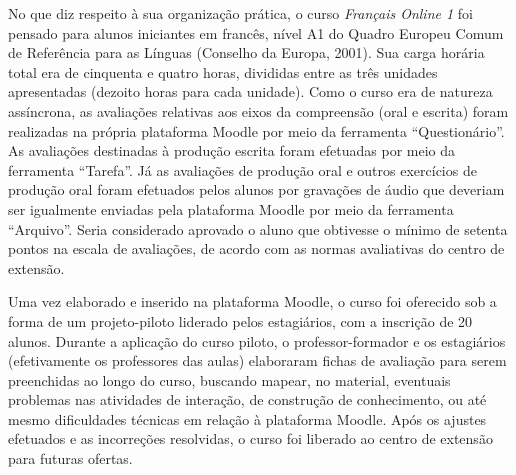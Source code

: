 No que diz respeito à sua organização prática, o curso \emph{Français
	Online 1} foi pensado para alunos iniciantes em francês, nível A1 do
Quadro Europeu Comum de Referência para as Línguas (Conselho da Europa,
2001). Sua carga horária total era de cinquenta e quatro horas,
divididas entre as três unidades apresentadas (dezoito horas para cada
unidade). Como o curso era de natureza assíncrona, as avaliações
relativas aos eixos da compreensão (oral e escrita) foram realizadas na
própria plataforma Moodle por meio da ferramenta \enquote{Questionário}. As
avaliações destinadas à produção escrita foram efetuadas por meio da
ferramenta \enquote{Tarefa}. Já as avaliações de produção oral e outros
exercícios de produção oral foram efetuados pelos alunos por gravações
de áudio que deveriam ser igualmente enviadas pela plataforma Moodle por
meio da ferramenta \enquote{Arquivo}. Seria considerado aprovado o aluno que
obtivesse o mínimo de setenta pontos na escala de avaliações, de acordo
com as normas avaliativas do centro de extensão.

Uma vez elaborado e inserido na plataforma Moodle, o curso foi oferecido
sob a forma de um projeto-piloto liderado pelos estagiários, com a
inscrição de 20 alunos. Durante a aplicação do curso piloto, o
professor-formador e os estagiários (efetivamente os professores das
aulas) elaboraram fichas de avaliação para serem preenchidas ao longo do
curso, buscando mapear, no material, eventuais problemas nas atividades
de interação, de construção de conhecimento, ou até mesmo dificuldades
técnicas em relação à plataforma Moodle. Após os ajustes efetuados e as
incorreções resolvidas, o curso foi liberado ao centro de extensão para
futuras ofertas.